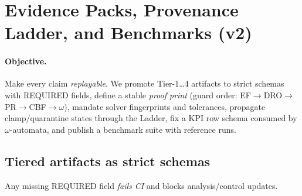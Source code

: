 \section{Evidence Packs, Provenance Ladder, and Benchmarks (v2)}\label{sec:pcc-bench-v2}

\paragraph{Objective.}
Make every claim \emph{replayable}. We promote Tier-1…4 artifacts to strict schemas with REQUIRED fields, define a stable \emph{proof print} (guard order: EF$\rightarrow$DRO$\rightarrow$PR$\rightarrow$CBF$\rightarrow\omega$), mandate solver fingerprints and tolerances, propagate clamp/quarantine states through the Ladder, fix a KPI row schema consumed by $\omega$-automata, and publish a benchmark suite with reference runs.

\subsection{Tiered artifacts as strict schemas}\label{subsec:schemas}
\emph{}

Any missing REQUIRED field \emph{fails CI} and blocks analysis/control updates.

